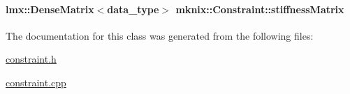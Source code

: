 \hypertarget{classmknix_1_1_constraint_ab4b508cdbea36124b925f52525a1d5ad}{
\paragraph[{stiffness\-Matrix}]{\setlength{\rightskip}{0pt plus 5cm}lmx\-::\-Dense\-Matrix$<${\bf data\-\_\-type}$>$ mknix\-::\-Constraint\-::stiffness\-Matrix\hspace{0.3cm}{\ttfamily [protected]}}}\label{classmknix_1_1_constraint_ab4b508cdbea36124b925f52525a1d5ad}


The documentation for this class was generated from the following files\-:\begin{DoxyCompactItemize}
\item 
\hyperlink{constraint_8h}{constraint.\-h}\item 
\hyperlink{constraint_8cpp}{constraint.\-cpp}\end{DoxyCompactItemize}
